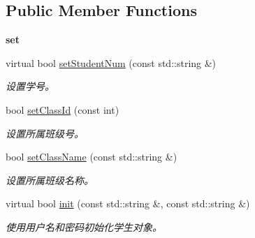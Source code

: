 \subsection*{\-Public \-Member \-Functions}
\begin{Indent}{\bf set}\par
\begin{DoxyCompactItemize}
\item 
virtual bool \hyperlink{classepStudent_ac274ba42ee17d35e320781cb2e8da574}{set\-Student\-Num} (const std\-::string \&)
\begin{DoxyCompactList}\small\item\em 设置学号。 \end{DoxyCompactList}\item 
bool \hyperlink{classepStudent_a3b79afc2c1ea03f850e007b3e545c8d7}{set\-Class\-Id} (const int)
\begin{DoxyCompactList}\small\item\em 设置所属班级号。 \end{DoxyCompactList}\item 
bool \hyperlink{classepStudent_a49dd418249de22896397be86bc732c8d}{set\-Class\-Name} (const std\-::string \&)
\begin{DoxyCompactList}\small\item\em 设置所属班级名称。 \end{DoxyCompactList}\item 
virtual bool \hyperlink{classepStudent_a687b2cea50b85886c5f520b260236dfb}{init} (const std\-::string \&, const std\-::string \&)
\begin{DoxyCompactList}\small\item\em 使用用户名和密码初始化学生对象。 \end{DoxyCompactList}\end{DoxyCompactItemize}
\end{Indent}
